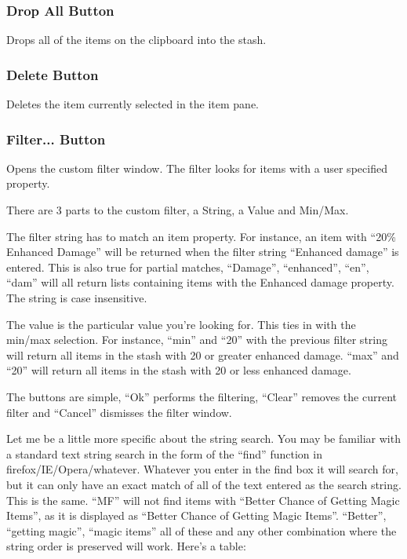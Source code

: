 \documentclass[a4paper,10pt]{article}
\begin{document}
\subsubsection{Drop All Button}

Drops all of the items on the clipboard into the stash.

\subsubsection{Delete Button}

Deletes the item currently selected in the item pane.

\subsubsection{Filter... Button}

Opens the custom filter window. The filter looks for items with a user specified property.

There are 3 parts to the custom filter, a String, a Value and Min/Max.

The filter string has to match an item property. For instance, an item with ``20\% Enhanced Damage'' will be returned when the filter string ``Enhanced damage'' is entered. This is also true for partial matches, ``Damage'', ``enhanced'', ``en'', ``dam'' will all return lists containing items with the Enhanced damage property. The string is case insensitive.

The value is the particular value you're looking for. This ties in with the min/max selection. For instance, ``min'' and ``20'' with the previous filter string will return all items in the stash with 20 or greater enhanced damage. ``max'' and ``20'' will return all items in the stash with 20 or less enhanced damage.

The buttons are simple, ``Ok'' performs the filtering, ``Clear'' removes the current filter and ``Cancel'' dismisses the filter window.

Let me be a little more specific about the string search. You may be familiar with a standard text string search in the form of the ``find'' function in firefox/IE/Opera/whatever. Whatever you enter in the find box it will search for, but it can only have an exact match of all of the text entered as the search string. This is the same. ``MF'' will not find items with ``Better Chance of Getting Magic Items'', as it is displayed as ``Better Chance of Getting Magic Items''. ``Better'', ``getting magic'', ``magic items'' all of these and any other combination where the string order is preserved will work. Here's a table:
\end{document}
